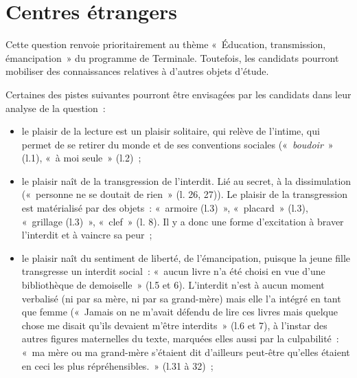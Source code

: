 \section{Centres étrangers}

		{Cette question renvoie prioritairement au thème «~Éducation, transmission,
émancipation~» du programme de Terminale. Toutefois, les candidats pourront
mobiliser des connaissances relatives à d'autres objets d'étude.

Certaines des pistes suivantes pourront être envisagées par les candidats dans leur
analyse de la question~:

\begin{itemize}
\item le plaisir de la lecture est un plaisir solitaire, qui relève de l'intime, qui permet de se
retirer du monde et de ses conventions sociales («~\emph{boudoir}~» (l.1), «~à moi seule~» (l.2)~;

\item le plaisir naît de la transgression de l'interdit. Lié au secret, à la dissimulation
(«~personne ne se doutait de rien~» (l. 26, 27)). Le plaisir de la transgression est
matérialisé par des objets~: «~armoire (l.3)~», «~placard~» (l.3), «~grillage (l.3)~», «~clef~»
(l. 8). Il y a donc une forme d'excitation à braver l'interdit et à vaincre sa peur~;

\item le plaisir naît du sentiment de liberté, de l'émancipation, puisque la jeune fille
transgresse un interdit social~: «~aucun livre n'a été choisi en vue d'une bibliothèque
de demoiselle~» (l.5 et 6). L'interdit n'est à aucun moment verbalisé (ni par sa mère, ni
par sa grand-mère) mais elle l'a intégré en tant que femme («~Jamais on ne m'avait
défendu de lire ces livres mais quelque chose me disait qu'ils devaient m'être
interdits~» (l.6 et 7), à l'instar des autres figures maternelles du texte, marquées elles aussi par la culpabilité~: «~ma mère ou ma grand-mère s'étaient dit d'ailleurs peut-être
qu'elles étaient en ceci les plus répréhensibles.~» (l.31 à 32)~;


\end{itemize}}
